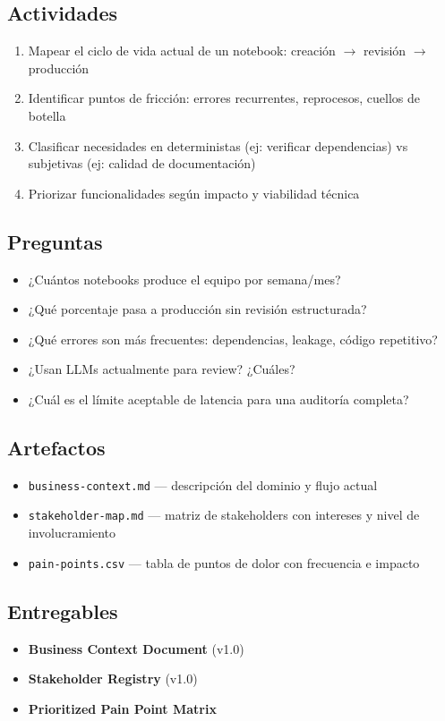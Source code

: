 \documentclass[12pt,a4paper]{article}
\begin{document}
\subsection*{Actividades}
\begin{enumerate}
  \item Mapear el ciclo de vida actual de un notebook: creación $\rightarrow$ revisión $\rightarrow$ producción
  \item Identificar puntos de fricción: errores recurrentes, reprocesos, cuellos de botella
  \item Clasificar necesidades en deterministas (ej: verificar dependencias) vs subjetivas (ej: calidad de documentación)
  \item Priorizar funcionalidades según impacto y viabilidad técnica
\end{enumerate}

\subsection*{Preguntas}
\begin{itemize}
  \item ¿Cuántos notebooks produce el equipo por semana/mes?
  \item ¿Qué porcentaje pasa a producción sin revisión estructurada?
  \item ¿Qué errores son más frecuentes: dependencias, leakage, código repetitivo?
  \item ¿Usan LLMs actualmente para review? ¿Cuáles?
  \item ¿Cuál es el límite aceptable de latencia para una auditoría completa?
\end{itemize}

\subsection*{Artefactos}
\begin{itemize}
  \item \texttt{business-context.md} --- descripción del dominio y flujo actual
  \item \texttt{stakeholder-map.md} --- matriz de stakeholders con intereses y nivel de involucramiento
  \item \texttt{pain-points.csv} --- tabla de puntos de dolor con frecuencia e impacto
\end{itemize}

\subsection*{Entregables}
\begin{itemize}
  \item \textbf{Business Context Document} (v1.0)
  \item \textbf{Stakeholder Registry} (v1.0)
  \item \textbf{Prioritized Pain Point Matrix}
\end{itemize}
\end{document}
